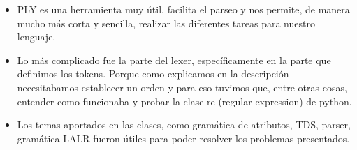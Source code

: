 \begin{itemize}
\item PLY es una herramienta muy útil, facilita el parseo y nos permite, de manera mucho más corta y sencilla, realizar las diferentes tareas para nuestro lenguaje.
\item Lo más complicado fue la parte del lexer, específicamente en la parte que definimos los tokens. Porque como explicamos en la descripción necesitabamos establecer un orden y para eso tuvimos que, entre otras cosas, entender como funcionaba y probar la clase re (regular expression) de python.
\item Los temas aportados en las clases, como gramática de atributos, TDS, parser, gramática LALR fueron útiles para poder resolver los problemas presentados.

\end{itemize}